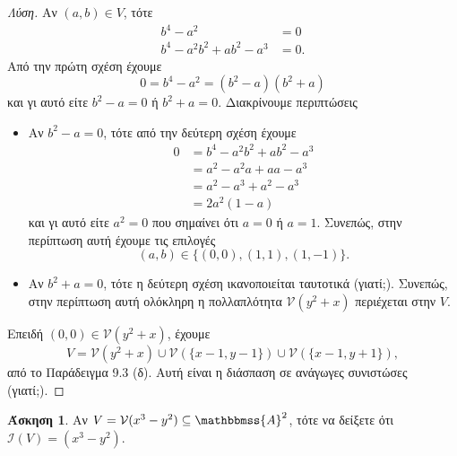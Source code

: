 \documentclass[12pt,a4paper,reqno]{amsart}
\theoremstyle{definition}
\newtheorem{exercise}{Άσκηση}
\renewcommand{\AA}{\mathbbmss{A}}
\newcommand{\iI}{\mathcal{I}}
\newcommand{\vV}{\mathcal{V}}
\begin{document}
\begin{proof}[Λύση]
  Αν $(a,b) \in V$, τότε 
  \begin{align*}
    b^4 - a^2 &= 0 \\
    b^4 - a^2b^2 + ab^2 - a^3 &= 0.
  \end{align*}
  Από την πρώτη σχέση έχουμε 
  \[
  0 = b^4 - a^2 = (b^2-a)(b^2+a)
  \]
  και γι αυτό είτε $b^2-a = 0$ ή $b^2 + a = 0$. Διακρίνουμε περιπτώσεις
  \begin{itemize}
    \item Αν $b^2 - a = 0$, τότε από την δεύτερη σχέση έχουμε 
    \begin{align*}
    0 &= b^4 - a^2b^2 + ab^2 - a^3 \\ 
    &= a^2 - a^2a + aa - a^3 \\
    &= a^2 - a^3 + a^2 - a^3\\
    &= 2a^2(1-a)
    \end{align*}
    και γι αυτό είτε $a^2 = 0$ που σημαίνει ότι $a=0$ ή $a = 1$. Συνεπώς, στην περίπτωση αυτή έχουμε τις επιλογές 
    \[
    (a,b) \in \{
      (0,0), (1,1), (1,-1)
    \}.
    \]
    \item Αν $b^2 + a = 0$, τότε η δεύτερη σχέση ικανοποιείται ταυτοτικά (γιατί;). Συνεπώς, στην περίπτωση αυτή ολόκληρη η πολλαπλότητα $\vV(y^2+x)$ περιέχεται στην $V$.
  \end{itemize}
  Επειδή $(0,0) \in \vV(y^2+x)$, έχουμε 
  \[
  V = \vV(y^2+x) \cup \vV(\{x-1,y-1\}) \cup \vV(\{x-1,y+1\}),
  \]
  από το Παράδειγμα 9.3 (δ). Αυτή είναι η διάσπαση σε ανάγωγες συνιστώσες (γιατί;).
\end{proof}

\begin{exercise}
  Αν $V = \vV(x^3-y^2) \subseteq \AA^2$, τότε να δείξετε ότι $\iI(V) = (x^3-y^2)$.
\end{exercise}
\end{document}
